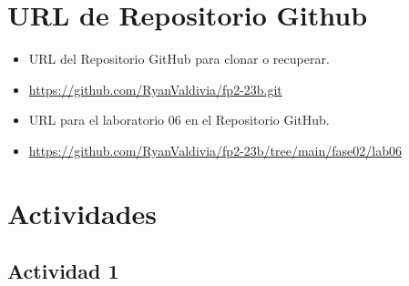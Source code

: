 \documentclass{article}
\begin{document}
	\section{URL de Repositorio Github}
	\begin{itemize}
		\item URL del Repositorio GitHub para clonar o recuperar.
		\item \url{https://github.com/RyanValdivia/fp2-23b.git}
		\item URL para el laboratorio 06 en el Repositorio GitHub.
		\item \url{https://github.com/RyanValdivia/fp2-23b/tree/main/fase02/lab06}
	\end{itemize}
	
	\section{Actividades}
	\subsection{Actividad 1}
	
\end{document}
